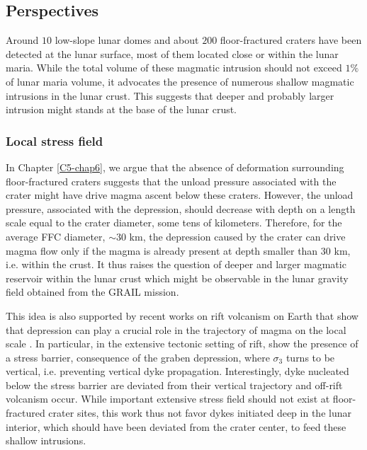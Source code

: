 \subsection{Perspectives}
\label{sec:perspectives-2}


Around  $10$ low-slope  lunar  domes and  about $200$  floor-fractured
craters have been detected at the  lunar surface, most of them located
close  or within  the lunar  maria. While  the total  volume of  these
magmatic intrusion should  not exceed $1\%$ of lunar  maria volume, it
advocates the presence of numerous  shallow magmatic intrusions in the
lunar crust. This  suggests that deeper and  probably larger intrusion
might stands at the base of the lunar crust.

\subsubsection*{Local stress field}
\label{sec:crust-magm-intr}

In Chapter  \ref{C5-chap6}, we argue  that the absence  of deformation
surrounding floor-fractured craters suggests  that the unload pressure
associated with the  crater might have drive magma  ascent below these
craters. However, the unload pressure, associated with the depression,
should  decrease with  depth on  a length  scale equal  to the  crater
diameter, some  tens of  kilometers.  Therefore,  for the  average FFC
diameter, $\sim 30$ km, the depression  caused by the crater can drive
magma flow only if the magma  is already present at depth smaller than
$30$ km, i.e.  within the crust. It thus raises the question of deeper
and larger  magmatic reservoir within  the lunar crust which  might be
observable in the lunar gravity field obtained from the GRAIL mission.

This idea is also supported by recent works on rift volcanism on Earth
that show that depression can play a crucial role in the trajectory of
magma on the local scale \citep{Maccaferri:2014ft}.  In particular, in
the extensive tectonic setting of rift, \citet{Maccaferri:2014ft} show
the  presence  of   a  stress  barrier,  consequence   of  the  graben
depression, where  $\sigma_3$ turns  to be vertical,  i.e.  preventing
vertical dyke  propagation.  Interestingly,  dyke nucleated  below the
stress  barrier  are  deviated  from  their  vertical  trajectory  and
off-rift  volcanism occur.   While  important  extensive stress  field
should not exist  at floor-fractured crater sites, this  work thus not
favor dykes  initiated deep in  the lunar interior, which  should have
been  deviated  from   the  crater  center,  to   feed  these  shallow
intrusions.

